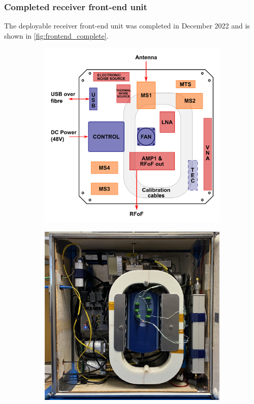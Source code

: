 \subsubsection{Completed receiver front-end unit}
The deployable receiver front-end unit was completed in December 2022 and is shown in \cref{fig:frontend_complete}. 
\begin{figure}
    \centering
    \centering
    \begin{subfigure}{.45\textwidth}
        \centering
        \includegraphics[width=\linewidth]{frontend_layout}
    \end{subfigure}
    \hfill
    \begin{subfigure}{.45\textwidth}
    \centering
        \includegraphics[width=\linewidth]{frontend.jpeg}

\end{subfigure}
\end{figure}
